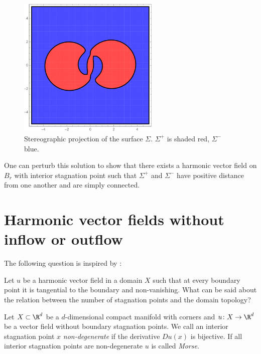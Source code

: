 \begin{frame}
  \begin{figure}
    \centering
    \includegraphics[width=0.6\textwidth]{../plots/n3_hf_inflowOutflow_Ball_Surface_2.pdf}
    \caption{Stereographic projection of the surface $\Sigma$. $\Sigma^+$ is shaded red, $\Sigma^-$ blue.}
    \label{pl:n3_hf_inflowOutflowStagnationPoint_Surface}
  \end{figure}
\end{frame}

\begin{frame}
  One can perturb this solution to show that there exists a harmonic vector field
  on $B_r$ with interior stagnation point such that $\Sigma^+$ and $\Sigma^-$ have positive distance
  from one another and are simply connected.
\end{frame}

\section{Harmonic vector fields without inflow or outflow}

\begin{frame}
  The following question is inspired by \cite{Lortz1970}:
  \begin{question}
    Let $u$ be a harmonic vector field in a domain $X$ such that at every boundary point it is tangential to the boundary
    and non-vanishing.
    What can be said about the relation between the number of stagnation points and the domain topology?
  \end{question}
\end{frame}

\begin{frame}
  \begin{definition}
    Let $X\subset\R^d$ be a $d$-dimensional compact manifold with corners and $u\colon X\to\R^d$ be a vector field without boundary stagnation points.
    We call an interior stagnation point $x$ \emph{non-degenerate} if the derivative $Du(x)$ is bijective.
    If all interior stagnation points are non-degenerate $u$ is called \emph{Morse}.
  \end{definition}
\end{frame}

